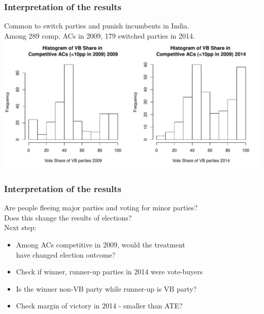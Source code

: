 \documentclass{beamer}
\begin{document}
\begin{frame}
\frametitle{Interpretation of the results}
Common to switch parties and punish incumbents in India.\\
Among 289 comp. ACs in 2009, 179 switched parties in 2014.\\
\includegraphics[scale=.45]{../Figures/VBcomp.pdf}
\end{frame}

\begin{frame}
\frametitle{Interpretation of the results}

Are people fleeing major parties and voting for minor parties?\\
Does this change the results of elections? \\
\medskip
Next step: 
\begin{itemize}
\item Among ACs competitive in 2009, would the treatment \\have changed election outcome?\\
\item Check if winner, runner-up parties in 2014 were vote-buyers
\item Is the winner non-VB party while runner-up is VB party?
\item Check margin of victory in 2014 - smaller than ATE?
\end{itemize}
\end{frame}
\end{document}
